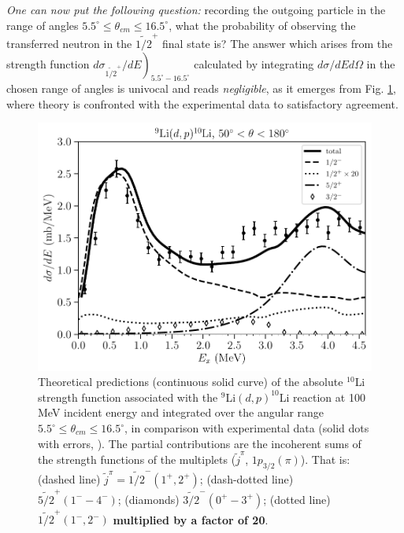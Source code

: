  \textit{One can now put the following question:} recording the outgoing particle in the range of angles $5.5^\circ\leq\theta_{cm}\leq16.5^\circ$, what the probability   of observing the transferred neutron in the $\widetilde{1/2}^+$ final state is? The answer which arises from the strength function $\left.d\sigma_{\widetilde{1/2}^+}/dE\right)_{5.5^\circ-16.5^\circ}$ calculated by integrating $d\sigma/dEd\Omega$ in the chosen range of angles is univocal and reads \textit{negligible}, as it emerges from Fig. \ref{fig5.2.4}, where theory is confronted with the experimental data to satisfactory agreement.
  \begin{figure}
	\centerline{\includegraphics[width=12cm]{C6/figs_C6/FigBook1}}
	\caption{  Theoretical predictions (continuous solid curve) of the absolute  $^{10}$Li strength function associated with the $^9$Li$(d,p)^{10}$Li reaction at 100 MeV incident energy and  integrated over the angular range $5.5^\circ\leq\theta_{cm}\leq16.5^\circ$, in comparison with experimental data (solid dots with errors, \cite{Cavallaro:17}). The partial contributions are the incoherent sums of the strength functions of the multiplets ($\widetilde {j}^\pi$, $1p_{3/2}(\pi)$). That is: (dashed line) $\widetilde j^\pi=\widetilde{1/2}^- (1^+,2^+)$; (dash-dotted line) $\widetilde{5/2}^+ (1^--4^-)$; (diamonds) $\widetilde{3/2}^- (0^+-3^+)$; (dotted line) $\widetilde{1/2}^+ (1^-,2^-)$ \textbf{multiplied by a factor of 20}.}\label{fig5.2.4}
\end{figure}
